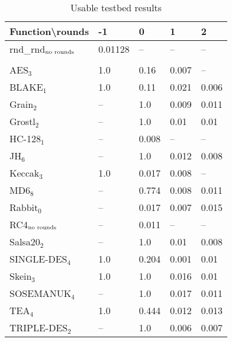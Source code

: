 \documentclass[twoside,a4paper]{article}
\begin{document}
\newcommand{\fd}{\cellcolor{red!13}}
\newcommand{\fn}{\cellcolor{green!13}}

\begin{table}[H]
\centering
\label{res_usable}
\begin{tabular}{l|l l l l}
Function\textbackslash{}rounds & -1 & 0 & 1 & 2\\ \hline
rnd\_rnd$_{\textnormal{no rounds}}$ & \fn{}0.01128 & --       & --         & --        \\\\
AES$_{3}$        & \fd{}1.0   & \fd{}0.16  & \fn{}0.007 & \fn{}--   \\
BLAKE$_{1}$      & \fd{}1.0   & \fd{}0.11  & \fn{}0.021 & \fn{}0.006\\
Grain$_{2}$      & \fd{}--    & \fd{}1.0   & \fn{}0.009 & \fn{}0.011\\
Grostl$_{2}$     & \fd{}--    & \fd{}1.0   & \fn{}0.01  & \fn{}0.01 \\
HC-128$_{1}$     & \fd{}--    & \fn{}0.008 & \fn{}--    & \fn{}--   \\
JH$_{6}$         & \fd{}--    & \fd{}1.0   & \fn{}0.012 & \fn{}0.008\\
Keccak$_{3}$     & \fd{}1.0   & \fn{}0.017 & \fn{}0.008 & \fn{}--   \\
MD6$_{8}$        & \fd{}--    & \fd{}0.774 & \fn{}0.008 & \fn{}0.011\\
Rabbit$_{0}$     & \fd{}--    & \fn{}0.017 & \fn{}0.007 & \fn{}0.015\\
RC4$_{\textnormal{no rounds}}$& -- & \fn{}0.011 & --         & --        \\
Salsa20$_{2}$    & \fd{}--    & \fd{}1.0   & \fn{}0.01  & \fn{}0.008\\
SINGLE-DES$_{4}$ & \fd{}1.0   & \fd{}0.204 & \fn{}0.001 & \fn{}0.01 \\
Skein$_{3}$      & \fd{}1.0   & \fd{}1.0   & \fn{}0.016 & \fn{}0.01 \\
SOSEMANUK$_{4}$  & \fd{}--    & \fd{}1.0   & \fn{}0.017 & \fn{}0.011\\
TEA$_{4}$        & \fd{}1.0   & \fd{}0.444 & \fn{}0.012 & \fn{}0.013\\
TRIPLE-DES$_{2}$ & \fd{}--    & \fd{}1.0   & \fn{}0.006 & \fn{}0.007
\end{tabular}
\caption{Usable testbed results}
\end{table}
\end{document}
